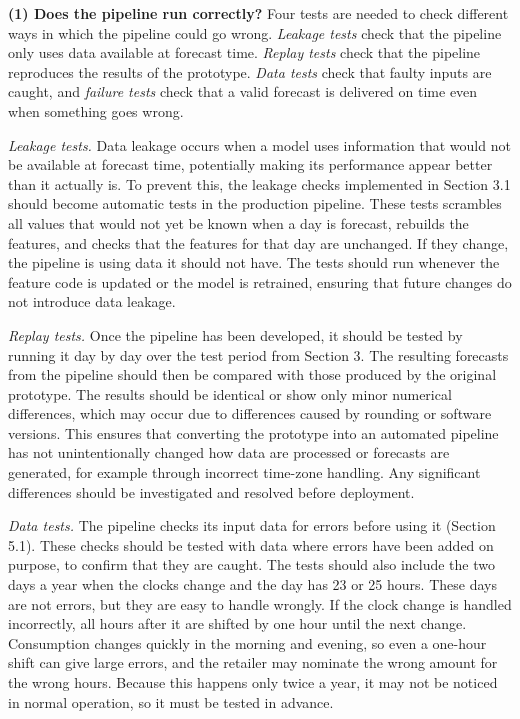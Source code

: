 \documentclass[11pt,a4paper]{article}
\begin{document}
\textbf{(1) Does the pipeline run correctly?} Four tests are needed to check different ways in which the pipeline could go wrong. \textit{Leakage tests} check that the pipeline only uses data available at forecast time. \textit{Replay tests} check that the pipeline reproduces the results of the prototype. \textit{Data tests} check that faulty inputs are caught, and \textit{failure tests} check that a valid forecast is delivered on time even when something goes wrong.

\textit{Leakage tests.} Data leakage occurs when a model uses information that would not be available at forecast time, potentially making its performance appear better than it actually is. To prevent this, the leakage checks implemented in Section 3.1 should become automatic tests in the production pipeline. These tests scrambles all values that would not yet be known when a day is forecast, rebuilds the features, and checks that the features for that day are unchanged. If they change, the pipeline is using data it should not have. The tests should run whenever the feature code is updated or the model is retrained, ensuring that future changes do not introduce data leakage.

\textit{Replay tests. }Once the pipeline has been developed, it should be tested by running it day by day over the test period from Section 3. The resulting forecasts from the pipeline should then be compared with those produced by the original prototype. The results should be identical or show only minor numerical differences, which may occur due to differences caused by rounding or software versions. This ensures that converting the prototype into an automated pipeline has not unintentionally changed how data are processed or forecasts are generated, for example through incorrect time-zone handling. Any significant differences should be investigated and resolved before deployment.

\textit{Data tests.} The pipeline checks its input data for errors before using it (Section 5.1). These checks should be tested with data where errors have been added on purpose, to confirm that they are caught. The tests should also include the two days a year when the clocks change and the day has 23 or 25 hours. These days are not errors, but they are easy to handle wrongly. If the clock change is handled incorrectly, all hours after it are shifted by one hour until the next change. Consumption changes quickly in the morning and evening, so even a one-hour shift can give large errors, and the retailer may nominate the wrong amount for the wrong hours. Because this happens only twice a year, it may not be noticed in normal operation, so it must be tested in advance.
\end{document}
